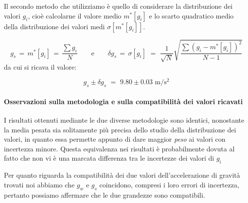Il secondo metodo che utilizziamo è quello di considerare la distribuzione dei valori $g_i$, cioè calcolarne il valore medio $m^*[g_i]$ e lo scarto quadratico medio della distribuzione dei valori medi $\sigma[m^*[g_i]]$.

\begin{equation*}
g_s \, = \, m^*[g_i] \, = \, \frac{\sum g_i}{N} \quad\quad \text{e} \quad\quad \delta g_s \, = \, \sigma[g_i] \,\, = \,\, \frac{1}{\sqrt{N}}\sqrt{\frac{\sum (g_i - m^*[g_i])^2}{N-1}}
\end{equation*}
%
da cui si ricava il valore:

\begin{equation}
g_s \pm \delta g_s \,\, = \,\, 9.80 \pm 0.03 \,\, \si{\metre\per\square\second}
\end{equation}

\paragraph{Osservazioni sulla metodologia e sulla compatibilità dei valori ricavati\\}

I risultati ottenuti mediante le due diverse metodologie sono identici, nonostante la media pesata sia solitamente più precisa dello studio della distribuzione dei valori, in quanto essa permette appunto di dare maggior \emph{peso} ai valori con incertezza minore. Questa equivalenza nei risultati è probabilmente dovuta al fatto che non vi è una marcata differenza tra le incertezze dei valori di $g_i$

Per quanto riguarda la compatibilità dei due valori dell'accelerazione di gravità trovati noi abbiamo che $g_w$ e $g_s$ coincidono, compresi i loro errori di incertezza, pertanto possiamo affermare che le due grandezze sono compatibili.

